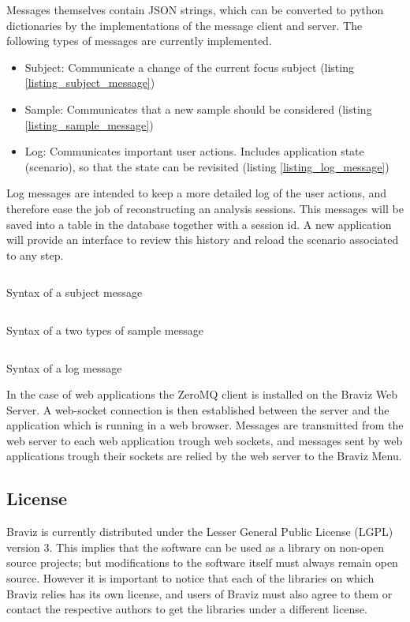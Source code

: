 Messages themselves contain JSON strings, which can be converted to python dictionaries by the implementations of the message client and server. The following types of messages are currently implemented.

\begin{itemize}
\item Subject: Communicate a change of the current focus subject (listing \ref{listing_subject_message})
\item Sample: Communicates that a new sample should be considered (listing \ref{listing_sample_message})
\item Log: Communicates important user actions. Includes application state (scenario), so that the state can be revisited (listing \ref{listing_log_message}) 
\end{itemize}

Log messages are intended to keep a more detailed log of the user actions, and therefore ease the job of reconstructing an analysis sessions. This messages will be saved into a table in the database together with a session id. A new application will provide an interface to review this history and reload the scenario associated to any step. 

\begin{listing}
\inputminted{js}{code/subject.js}
\caption{Syntax of a subject message}
\label{listing_subject_message}
\end{listing}

\begin{listing}
\inputminted{js}{code/sample.js}
\caption{Syntax of a two types of sample message}
\label{listing_sample_message}
\end{listing}

\begin{listing}
\inputminted{js}{code/log.js}
\caption{Syntax of a log message}
\label{listing_log_message}
\end{listing}

In the case of web applications the ZeroMQ client is installed on the Braviz Web Server. A web-socket connection is then established between the server and the application which is running in a web browser. Messages are transmitted from the web server to each web application trough web sockets, and messages sent by web applications trough their sockets are relied by the web server to the Braviz Menu.

\subsection{License}

Braviz is currently distributed under the Lesser General Public License (LGPL) version 3. This implies that the software can be used as a library on non-open source projects; but modifications to the software itself must always remain open source. However it is important to notice that each of the libraries on which Braviz relies has its own license, and users of Braviz must also agree to them or contact the respective authors to get the libraries under a different license.

